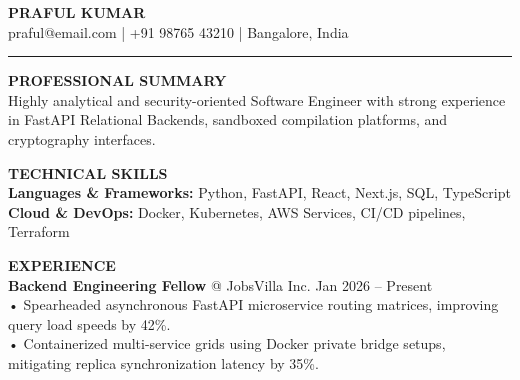 \documentclass[10pt,letterpaper]{article}
\begin{document}
\begin{center}
{\Huge \bf PRAFUL KUMAR} \\
\vspace{1.5mm}
praful@email.com | +91 98765 43210 | Bangalore, India
\end{center}

\hrule
\vspace{3mm}

{\large \bf PROFESSIONAL SUMMARY} \\
\vspace{1.5mm}
Highly analytical and security-oriented Software Engineer with strong experience in FastAPI Relational Backends, sandboxed compilation platforms, and cryptography interfaces.

\vspace{3.0mm}
{\large \bf TECHNICAL SKILLS} \\
\vspace{1.5mm}
\textbf{Languages & Frameworks:} Python, FastAPI, React, Next.js, SQL, TypeScript \\
\textbf{Cloud & DevOps:} Docker, Kubernetes, AWS Services, CI/CD pipelines, Terraform

\vspace{3.0mm}
{\large \bf EXPERIENCE} \\
\vspace{2mm}
\textbf{Backend Engineering Fellow} @ JobsVilla Inc. \hfill Jan 2026 -- Present \\
• Spearheaded asynchronous FastAPI microservice routing matrices, improving query load speeds by 42\%. \\
• Containerized multi-service grids using Docker private bridge setups, mitigating replica synchronization latency by 35\%.
\end{document}

